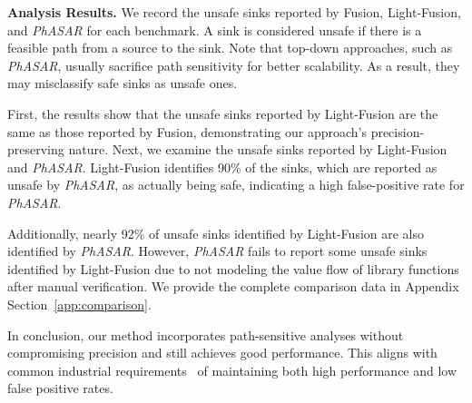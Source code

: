 \textbf{Analysis Results.}
We record the unsafe sinks reported by Fusion, Light-Fusion, and \textit{PhASAR} for each benchmark. 
A sink is considered unsafe if there is a feasible path from a source to the sink.
Note that top-down approaches, such as \textit{PhASAR}, usually sacrifice path sensitivity for better scalability. As a result, they may misclassify safe sinks as unsafe ones. 


First, the results show that the unsafe sinks reported by Light-Fusion are the same as those reported by Fusion, demonstrating our approach's precision-preserving nature. 
Next, we examine the unsafe sinks reported by Light-Fusion and \textit{PhASAR}. 
Light-Fusion identifies 90\% of the sinks, which are reported as unsafe by \textit{PhASAR}, as actually being safe, indicating a high false-positive rate for \textit{PhASAR}. 

Additionally, nearly 92\% of unsafe sinks identified by Light-Fusion are also identified by \textit{PhASAR}. 
However, \textit{PhASAR} fails to report some unsafe sinks identified by Light-Fusion due to not modeling the value flow of library functions after manual verification.
We provide the complete comparison data in Appendix Section~\ref{app:comparison}.

In conclusion, our method incorporates path-sensitive analyses without compromising precision and still achieves good performance. 
This aligns with common industrial requirements~\cite{bessey2010few, mcpeak2013scalable} of maintaining both high performance and low false positive rates.


